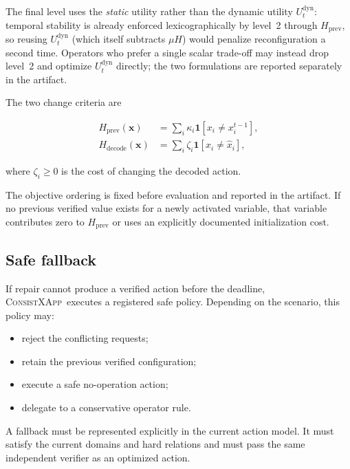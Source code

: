 \documentclass[pdflatex,sn-mathphys-num,iicol,oneside]{sn-jnl}
\newcommand{\method}{\textsc{ConsistXApp}}
\begin{document}
The final level uses the \emph{static} utility rather than the dynamic
utility $U_t^{\mathrm{dyn}}$: temporal stability is already enforced
lexicographically by level~2 through $H_{\mathrm{prev}}$, so reusing
$U_t^{\mathrm{dyn}}$ (which itself subtracts $\mu H$) would penalize
reconfiguration a second time. Operators who prefer a single scalar
trade-off may instead drop level~2 and optimize $U_t^{\mathrm{dyn}}$
directly; the two formulations are reported separately in the
artifact.

The two change criteria are

\begin{align}
H_{\mathrm{prev}}(\bm{x})
&=
\sum_i
\kappa_i
\mathbf{1}
[x_i\neq x_i^{t-1}],
\label{eq:previous-distance}\\
H_{\mathrm{decode}}(\bm{x})
&=
\sum_i
\zeta_i
\mathbf{1}
[x_i\neq\widehat{x}_i],
\label{eq:decode-distance}
\end{align}

where $\zeta_i\geq 0$ is the cost of changing the decoded action.

The objective ordering is fixed before evaluation and reported in the
artifact. If no previous verified value exists for a newly activated
variable, that variable contributes zero to
$H_{\mathrm{prev}}$ or uses an explicitly documented initialization
cost.

\subsection{Safe fallback}

If repair cannot produce a verified action before the deadline,
\method\ executes a registered safe policy. Depending on the
scenario, this policy may:

\begin{itemize}
    \item reject the conflicting requests;
    \item retain the previous verified configuration;
    \item execute a safe no-operation action;
    \item delegate to a conservative operator rule.
\end{itemize}

A fallback must be represented explicitly in the current action model.
It must satisfy the current domains and hard relations and must pass
the same independent verifier as an optimized action.
\end{document}
